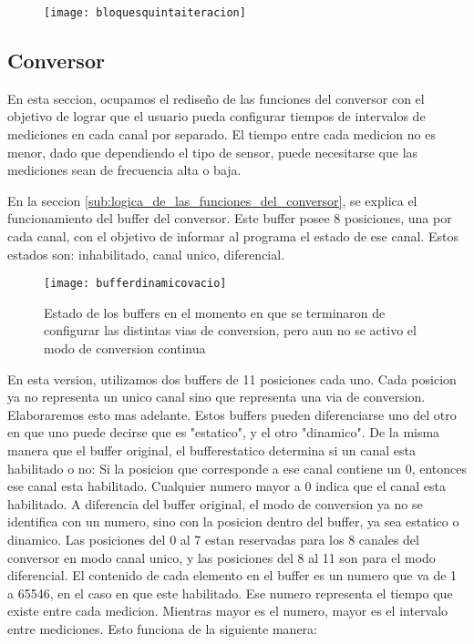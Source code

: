 \begin{figure}[h]
  \centering
  \texttt{[image: bloquesquintaiteracion]}
  \caption{}\label{fig:bloquesquintaiteracion}
\end{figure}

\subsection{Conversor} %
\label{sub:conversor}


En esta seccion, ocupamos el rediseño de las funciones del conversor con el objetivo de lograr que el usuario pueda configurar tiempos de intervalos de mediciones en cada canal por separado. El tiempo entre cada medicion no es menor, dado que dependiendo el tipo de sensor, puede necesitarse que las mediciones sean de frecuencia alta o baja.

En la seccion \ref{sub:logica_de_las_funciones_del_conversor}, se explica el funcionamiento del buffer del conversor. Este buffer posee 8 posiciones, una por cada canal, con el objetivo de informar al programa el estado de ese canal. Estos estados son: inhabilitado, canal unico, diferencial.

\begin{figure}[h]
  \centering
  \texttt{[image: bufferdinamicovacio]}
  \caption{Estado de los buffers en el momento en que se terminaron de configurar las distintas vias de conversion, pero aun no se activo el modo de conversion continua}\label{fig:bufferdinamicovacio}
\end{figure}



En esta version, utilizamos dos buffers de 11 posiciones cada uno. Cada posicion ya no representa un unico canal sino que representa una via de conversion. Elaboraremos esto mas adelante. Estos buffers pueden diferenciarse uno del otro en que uno puede decirse que es "estatico", y el otro "dinamico". De la misma manera que el buffer original, el bufferestatico determina si un canal esta habilitado o no: Si la posicion que corresponde a ese canal contiene un 0, entonces ese canal esta habilitado. Cualquier numero mayor a  0 indica que el canal esta habilitado. A diferencia del buffer original, el modo de conversion ya no se identifica con un numero, sino con la posicion dentro del buffer, ya sea estatico o dinamico. Las posiciones del 0 al 7 estan reservadas para los 8 canales del conversor en modo canal unico, y las posiciones del 8 al 11 son para el modo diferencial. 
El contenido de cada elemento en el buffer es un numero que va de 1 a 65546, en el caso en que este habilitado. Ese numero representa el tiempo que existe entre cada medicion. Mientras mayor es el numero, mayor es el intervalo entre mediciones. Esto funciona de la siguiente manera:

